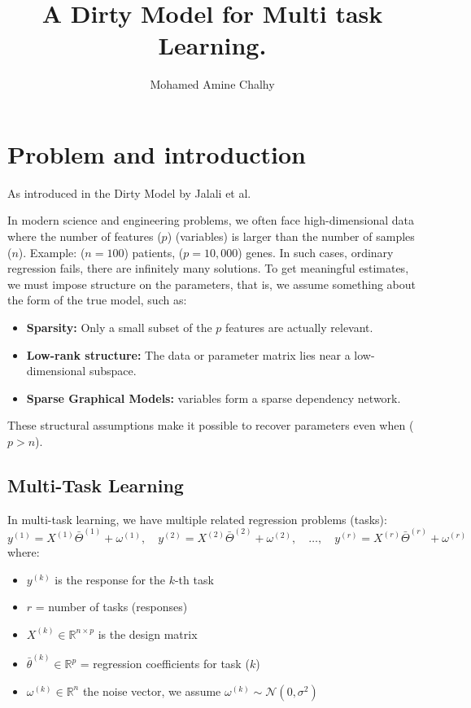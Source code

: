 \documentclass{article}
\title{A Dirty Model for Multi task Learning.}
\author{Mohamed Amine Chalhy}
\begin{document}
\date{}
\maketitle
\tableofcontents  

\newpage

\section{Problem and introduction}
As introduced in the Dirty Model by Jalali et al.~\cite{jalali2010dirty}

In modern science and engineering problems, we often face high-dimensional data
where the number of features ($p$) (variables) is larger than the number of samples ($n$).
Example: ($n=100$) patients, ($p=10,000$) genes.
In such cases, ordinary regression fails, there are infinitely many solutions.
To get meaningful estimates, we must impose structure on the parameters,
that is, we assume something about the form of the true model, such as:
\begin{itemize}
    \item \textbf{Sparsity:} Only a small subset of the $p$ features are actually relevant.
    \item \textbf{Low-rank structure:} The data or parameter matrix lies near a low-dimensional subspace.
    \item \textbf{Sparse Graphical Models:} variables form a sparse dependency network.
\end{itemize}
These structural assumptions make it possible to recover parameters even when ($p > n$).

\subsection{Multi-Task Learning}
In multi-task learning, we have multiple related regression problems (tasks):
$$y^{(1)} = X^{(1)}\bar{\Theta}^{(1)} + \omega^{(1)}, \quad
y^{(2)} = X^{(2)}\bar{\Theta}^{(2)} + \omega^{(2)}, \quad \dots, \quad
y^{(r)} = X^{(r)}\bar{\Theta}^{(r)} + \omega^{(r)}$$
where:
\begin{itemize}
    \item $y^{(k)}$ is the response for the $k$-th task
    \item $r$ = number of tasks (responses)
    \item $X^{(k)} \in \mathbb{R}^{n \times p}$ is the design matrix
    \item $\bar{\theta}^{(k)} \in \mathbb{R}^p$ = regression coefficients for task ($k$)
    \item $\omega^{(k)} \in \mathbb{R}^n$ the noise vector, we assume $\omega^{(k)} \sim \mathcal{N}(0, \sigma^2)$
\end{itemize}
\end{document}
